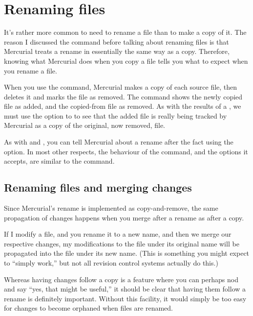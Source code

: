 \section{Renaming files}

It's rather more common to need to rename a file than to make a copy
of it.  The reason I discussed the  command before talking
about renaming files is that Mercurial treats a rename in essentially
the same way as a copy.  Therefore, knowing what Mercurial does when
you copy a file tells you what to expect when you rename a file.

When you use the  command, Mercurial makes a copy of
each source file, then deletes it and marks the file as removed.
The  command shows the newly copied file as added, and
the copied-from file as removed.
As with the results of a , we must use the
 option to  to see that the added file
is really being tracked by Mercurial as a copy of the original, now
removed, file.

As with  and , you can tell Mercurial about
a rename after the fact using the  option.  In
most other respects, the behaviour of the  command, and
the options it accepts, are similar to the  command.

\subsection{Renaming files and merging changes}

Since Mercurial's rename is implemented as copy-and-remove, the same
propagation of changes happens when you merge after a rename as after
a copy.

If I modify a file, and you rename it to a new name, and then we merge
our respective changes, my modifications to the file under its
original name will be propagated into the file under its new name.
(This is something you might expect to ``simply work,'' but not all
revision control systems actually do this.)

Whereas having changes follow a copy is a feature where you can
perhaps nod and say ``yes, that might be useful,'' it should be clear
that having them follow a rename is definitely important.  Without
this facility, it would simply be too easy for changes to become
orphaned when files are renamed.

